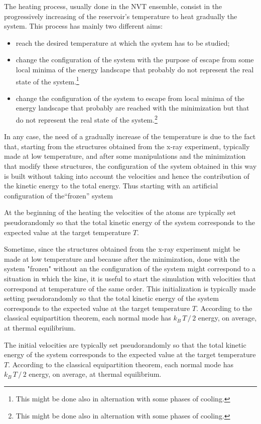 The heating process, usually done in the NVT ensemble, consist in the progressively increasing of  the reservoir's temperature to heat gradually the system. This process has mainly two different aims: 
\begin{itemize}
\item reach the desired temperature at which the system has to be studied;
\item change the configuration of the system with the purpose of escape from some local minima of the energy landscape that probably do not represent the real state of the system.\footnote{This might be done also in alternation with some phases of cooling.}
\item change the configuration of the system to escape from local minima of the energy landscape that probably are reached with the minimization but that do not represent the real state of the system.\footnote{This might be done also in alternation with some phases of cooling.}
\end{itemize}
In any case, the need of a gradually increase of the temperature is due to the fact that, starting from the structures obtained from the x-ray experiment, typically made at low temperature, and after some manipulations and the minimization that modify these structures, the configuration of the system obtained in this way is built without taking into account the velocities and hence the contribution of the kinetic energy to the total energy. Thus starting with an artificial configuration of the``frozen'' system 

At the beginning of the heating the velocities of the atoms are typically set pseudorandomly so that the total kinetic energy of the system corresponds to the expected value at the target temperature $T$.

Sometime, since the structures obtained from the x-ray experiment might be made at low temperature and because after the minimization, done with the system "frozen" without an the configuration of the system might correspond to a situation in which the kine, it is useful to start the simulation with velocities that correspond at temperature of the same order.
This initialization is typically made setting pseudorandomly so that the total kinetic energy of the system corresponds to the expected value at the target temperature $T$. According to the classical equipartition theorem, each normal mode has $k_B \, T \,/\,2$ energy, on average, at thermal equilibrium.

The initial velocities are typically set pseudorandomly so that the total kinetic energy of the system corresponds to the expected value at the target temperature $T$. According to the classical equipartition theorem, each normal mode has $k_B \, T \,/\,2$ energy, on average, at thermal equilibrium.

